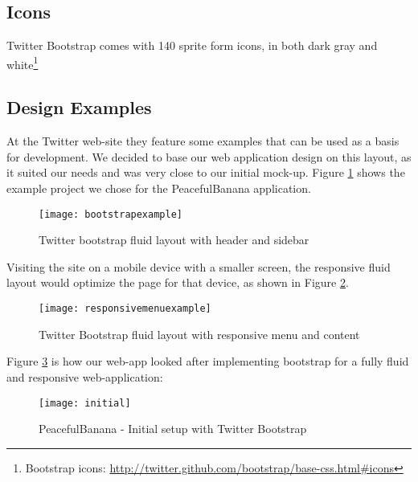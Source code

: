 \subsection{Icons}
Twitter Bootstrap comes with 140 sprite form icons, in both dark gray and white\footnote{Bootstrap icons: \url{http://twitter.github.com/bootstrap/base-css.html\#icons}} 

\subsection{Design Examples}
At the Twitter web-site they feature some examples that can be used as a basis for development. We decided to base our web application design on this layout, as it suited our needs and was very close to our initial mock-up. Figure \ref{bootstrapexample} shows the example project we chose for the PeacefulBanana application. 
\begin{figure}[H]
\centering
	\texttt{[image: bootstrapexample]}
\caption{Twitter bootstrap fluid layout with header and sidebar \citep{twitterbootstrap}}
\label{bootstrapexample}
\end{figure}

Visiting the site on a mobile device with a smaller screen, the responsive fluid layout would optimize the page for that device, as shown in Figure \ref{bootstrapresponsive}.
\begin{figure}[H]
\centering
	\texttt{[image: responsivemenuexample]}
\caption{Twitter Bootstrap fluid layout with responsive menu and content \citep{twitterbootstrap}}
\label{bootstrapresponsive}
\end{figure}

Figure \ref{initialsetup} is how our web-app looked after implementing bootstrap for a fully fluid and responsive web-application:
\begin{figure}[H]
\centering
	\texttt{[image: initial]}
\caption{PeacefulBanana - Initial setup with Twitter Bootstrap}
\label{initialsetup}
\end{figure}

